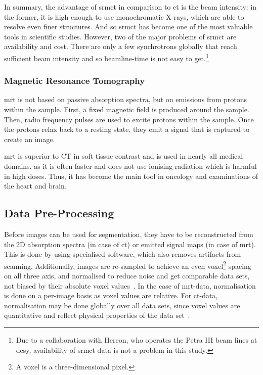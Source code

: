 In summary, the advantage of \gls{srmct} in comparison to \gls{ct} is the beam intensity: in the former, it is high enough to use monochromatic X-rays, which are able to resolve even finer structures.
And so \gls{srmct} has become one of the most valuable tools in scientific studies.
However, two of the major problems of \gls{srmct} are availability and cost. 
There are only a few synchrotrons globally that reach sufficient beam intensity and so beamline-time is not easy to get.\footnote{Due to a collaboration with Hereon, who operates the Petra III beam lines at \gls{desy}, availability of \gls{srmct} data is not a problem in this study.}

\subsubsection{Magnetic Resonance Tomography}\label{subsubsec:magnetic-resonance-tomography}
\gls{mrt} is not based on passive absorption spectra, but on emissions from protons within the sample.
First, a fixed magnetic field is produced around the sample.
Then, radio frequency pulses are used to excite protons within the sample.
Once the protons relax back to a resting state, they emit a signal that is captured to create an image.~\autocite{Bercovich2018}

\gls{mrt} is superior to CT in soft tissue contrast and is used in nearly all medical domains, as it is often faster and does not use ionising radiation which is harmful in high doses.
Thus, it has become the main tool in oncology and examinations of the heart and brain.~\autocite{Bercovich2018}

\subsection{Data Pre-Processing}\label{subsec:data-pre-processing}
Before images can be used for segmentation, they have to be reconstructed from the 2D absorption spectra (in case of \gls{ct}) or emitted signal maps (in case of \gls{mrt}).
This is done by using specialised software, which also removes artifacts from scanning.
Additionally, images are re-sampled to achieve an even voxel\footnote{A voxel is a three-dimensional pixel.} spacing on all three axis, and normalised to reduce noise and get comparable data sets, not biased by their absolute voxel values~\autocite{Rorden2012}.
In the case of \gls{mrt}-data, normalisation is done on a per-image basis as voxel values are relative.
For \gls{ct}-data, normalisation may be done globally over all data sets, since voxel values are quantitative and reflect physical properties of the data set~\autocite{Isensee2019}.


